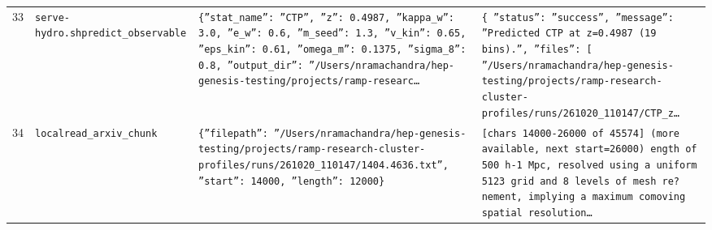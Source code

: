 \documentclass[11pt,a4paper]{article}
\begin{document}
\begin{longtable}{@{}p{}p{}p{}p{}@{}}
33 & \texttt{serve-hydro.sh}\newline\texttt{predict\_\allowbreak{}observable} & \texttt{\{''stat\_\allowbreak{}name'':\allowbreak{} ''CTP'',\allowbreak{} ''z'':\allowbreak{} 0.4987,\allowbreak{} ''kappa\_\allowbreak{}w'':\allowbreak{} 3.0,\allowbreak{} ''e\_\allowbreak{}w'':\allowbreak{} 0.6,\allowbreak{} ''m\_\allowbreak{}seed'':\allowbreak{} 1.3,\allowbreak{} ''v\_\allowbreak{}kin'':\allowbreak{} 0.65,\allowbreak{} ''eps\_\allowbreak{}kin'':\allowbreak{} 0.61,\allowbreak{} ''omega\_\allowbreak{}m'':\allowbreak{} 0.1375,\allowbreak{} ''sigma\_\allowbreak{}8'':\allowbreak{} 0.8,\allowbreak{} ''output\_\allowbreak{}dir'':\allowbreak{} ''/\allowbreak{}Users/\allowbreak{}nramachandra/\allowbreak{}hep-genesis-testing/\allowbreak{}projects/\allowbreak{}ramp-researc\ldots{}\allowbreak{}} & \texttt{\{   ''status'':\allowbreak{} ''success'',\allowbreak{}   ''message'':\allowbreak{} ''Predicted CTP at z=\allowbreak{}0.4987 (19 bins)\allowbreak{}.'',\allowbreak{}   ''files'':\allowbreak{} [     ''/\allowbreak{}Users/\allowbreak{}nramachandra/\allowbreak{}hep-genesis-testing/\allowbreak{}projects/\allowbreak{}ramp-research-cluster-profiles/\allowbreak{}runs/\allowbreak{}261020\_\allowbreak{}110147/\allowbreak{}CTP\_\allowbreak{}z\ldots{}\allowbreak{}} \\
34 & \texttt{local}\newline\texttt{read\_\allowbreak{}arxiv\_\allowbreak{}chunk} & \texttt{\{''filepath'':\allowbreak{} ''/\allowbreak{}Users/\allowbreak{}nramachandra/\allowbreak{}hep-genesis-testing/\allowbreak{}projects/\allowbreak{}ramp-research-cluster-profiles/\allowbreak{}runs/\allowbreak{}261020\_\allowbreak{}110147/\allowbreak{}1404.4636.txt'',\allowbreak{} ''start'':\allowbreak{} 14000,\allowbreak{} ''length'':\allowbreak{} 12000\}\allowbreak{}} & \texttt{[chars 14000-26000 of 45574]\allowbreak{} (more available,\allowbreak{} next start=\allowbreak{}26000)\allowbreak{}  ength of 500 h-1 Mpc,\allowbreak{} resolved using a uniform 5123 grid and 8 levels of mesh re?nement,\allowbreak{} implying a maximum comoving spatial resolution\ldots{}\allowbreak{}} \\

\end{longtable}
\end{document}
